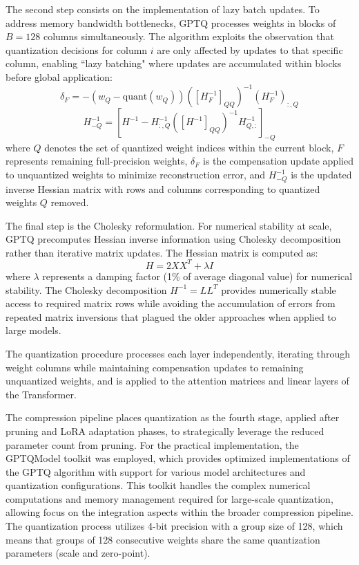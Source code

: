 The second step consists on the implementation of lazy batch updates. To address memory bandwidth bottlenecks, GPTQ processes weights in blocks of $B=128$ columns simultaneously. The algorithm exploits the observation that quantization decisions for column $i$ are only affected by updates to that specific column, enabling ``lazy batching" where updates are accumulated within blocks before global application:
\begin{equation}
\delta_F = -(w_Q - \text{quant}(w_Q))([H_F^{-1}]_{QQ})^{-1}(H_F^{-1})_{:,Q}
\end{equation}
\begin{equation}
H_{-Q}^{-1} = \left[H^{-1} - H_{:,Q}^{-1}([H^{-1}]_{QQ})^{-1}H_{Q,:}^{-1}\right]_{-Q}
\end{equation}
where $Q$ denotes the set of quantized weight indices within the current block, $F$ represents remaining full-precision weights, $\delta_F$ is the compensation update applied to unquantized weights to minimize reconstruction error, and $H_{-Q}^{-1}$ is the updated inverse Hessian matrix with rows and columns corresponding to quantized weights $Q$ removed.

The final step is the Cholesky reformulation. For numerical stability at scale, GPTQ precomputes Hessian inverse information using Cholesky decomposition rather than iterative matrix updates. The Hessian matrix is computed as:
\begin{equation}
H = 2XX^T + \lambda I
\end{equation}
where $\lambda$ represents a damping factor (1\% of average diagonal value) for numerical stability. The Cholesky decomposition $H^{-1} = LL^T$ provides numerically stable access to required matrix rows while avoiding the accumulation of errors from repeated matrix inversions that plagued the older approaches when applied to large models.

The quantization procedure processes each layer independently, iterating through weight columns while maintaining compensation updates to remaining unquantized weights, and is applied to the attention matrices and linear layers of the Transformer.

The compression pipeline places quantization as the fourth stage, applied after pruning and LoRA adaptation phases, to strategically leverage the reduced parameter count from pruning. For the practical implementation, the GPTQModel toolkit \cite{gptqmodel} was employed, which provides optimized implementations of the GPTQ algorithm with support for various model architectures and quantization configurations. This toolkit handles the complex numerical computations and memory management required for large-scale quantization, allowing focus on the integration aspects within the broader compression pipeline. The quantization process utilizes 4-bit precision with a group size of 128, which means that groups of 128 consecutive weights share the same quantization parameters (scale and zero-point).

